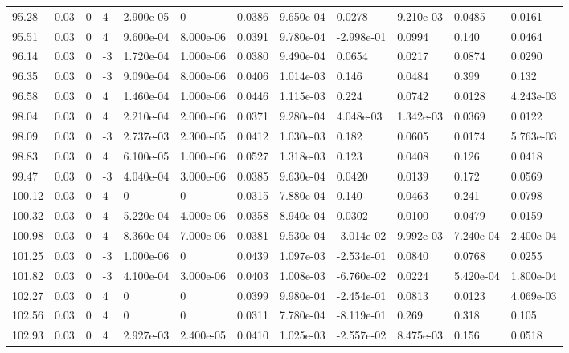\documentclass[preview]{standalone}
\begin{document}
{{{{{{\begin{tabular}{L{1.2cm}C{1.2cm} C{0.3cm}C{0.5cm} C{1.4cm}C{1.4cm} C{1.4cm}C{1.4cm} C{1.6cm}C{1.6cm} C{1.6cm}C{1.6cm}}
  95.28  &  0.03  & 0     &  4 &  2.900e-05  & 0  &  0.0386&   9.650e-04& 0.0278 & 9.210e-03   &  0.0485 & 0.0161  \\ 
  95.51  &  0.03  & 0     &  4 &  9.600e-04  & 8.000e-06  &  0.0391&   9.780e-04& -2.998e-01 & 0.0994   &  0.140 & 0.0464  \\ 
  96.14  &  0.03  & 0     & -3 &  1.720e-04  & 1.000e-06  &  0.0380&   9.490e-04& 0.0654 & 0.0217   &  0.0874 & 0.0290  \\ 
  96.35  &  0.03  & 0     & -3 &  9.090e-04  & 8.000e-06  &  0.0406&   1.014e-03& 0.146 & 0.0484   &  0.399 & 0.132  \\ 
  96.58  &  0.03  & 0     &  4 &  1.460e-04  & 1.000e-06  &  0.0446&   1.115e-03& 0.224 & 0.0742   &  0.0128 & 4.243e-03  \\ 
  98.04  &  0.03  & 0     &  4 &  2.210e-04  & 2.000e-06  &  0.0371&   9.280e-04& 4.048e-03 & 1.342e-03   &  0.0369 & 0.0122  \\ 
  98.09  &  0.03  & 0     & -3 &  2.737e-03  & 2.300e-05  &  0.0412&   1.030e-03& 0.182 & 0.0605   &  0.0174 & 5.763e-03  \\ 
  98.83  &  0.03  & 0     &  4 &  6.100e-05  & 1.000e-06  &  0.0527&   1.318e-03& 0.123 & 0.0408   &  0.126 & 0.0418  \\ 
  99.47  &  0.03  & 0     & -3 &  4.040e-04  & 3.000e-06  &  0.0385&   9.630e-04& 0.0420 & 0.0139   &  0.172 & 0.0569  \\ 
  100.12  &  0.03  & 0     &  4 &  0  & 0  &  0.0315&   7.880e-04& 0.140 & 0.0463   &  0.241 & 0.0798  \\ 
  100.32  &  0.03  & 0     &  4 &  5.220e-04  & 4.000e-06  &  0.0358&   8.940e-04& 0.0302 & 0.0100   &  0.0479 & 0.0159  \\ 
  100.98  &  0.03  & 0     &  4 &  8.360e-04  & 7.000e-06  &  0.0381&   9.530e-04& -3.014e-02 & 9.992e-03   &  7.240e-04 & 2.400e-04  \\ 
  101.25  &  0.03  & 0     & -3 &  1.000e-06  & 0  &  0.0439&   1.097e-03& -2.534e-01 & 0.0840   &  0.0768 & 0.0255  \\ 
  101.82  &  0.03  & 0     & -3 &  4.100e-04  & 3.000e-06  &  0.0403&   1.008e-03& -6.760e-02 & 0.0224   &  5.420e-04 & 1.800e-04  \\ 
  102.27  &  0.03  & 0     &  4 &  0  & 0  &  0.0399&   9.980e-04& -2.454e-01 & 0.0813   &  0.0123 & 4.069e-03  \\ 
  102.56  &  0.03  & 0     &  4 &  0  & 0  &  0.0311&   7.780e-04& -8.119e-01 & 0.269   &  0.318 & 0.105  \\ 
  102.93  &  0.03  & 0     &  4 &  2.927e-03  & 2.400e-05  &  0.0410&   1.025e-03& -2.557e-02 & 8.475e-03   &  0.156 & 0.0518  \\ 
\hline 
\end{tabular} 

}}}}}}
\end{document}
